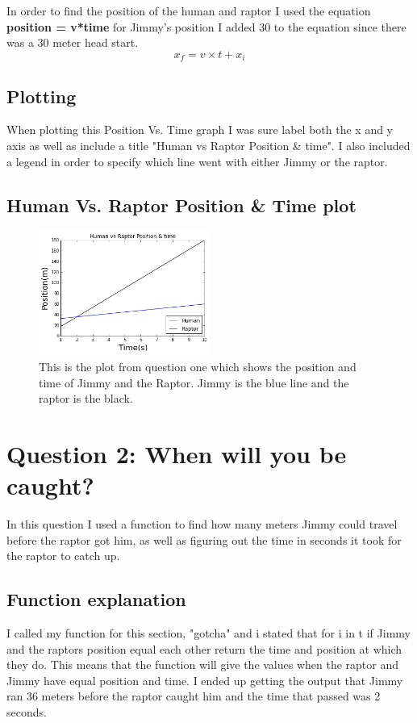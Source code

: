 \documentclass[twocolumn]{revtex4}
\begin{document}
In order to find the position of the human and raptor I used the equation \textbf{position = v*time} for Jimmy's position I added 30 to the equation since there was a 30 meter head start.$$x_f = v \times t + x_i $$ 

\subsection{Plotting}
When plotting this Position Vs. Time graph I was sure label both the x and y axis as well as include a title "Human vs Raptor Position \& time". I also included a legend in order to specify which line went with either Jimmy or the raptor.


\subsection{Human Vs. Raptor Position \& Time plot}
\begin{figure}
\includegraphics[width=0.5\textwidth]{Jimmy_Graph.png}
\caption {This is the plot from question one which shows the 	position and time of Jimmy and the Raptor. Jimmy is the blue line and the raptor is the black.}
\label{fig:Position vs. Time}
\end{figure}


\section{Question 2: When will you be caught?}

In this question I used a function to find how many meters Jimmy could travel before the raptor got him, as well as figuring out the time in seconds it took for the raptor to catch up. 

\subsection{Function explanation}

I called my function for this section, "gotcha" and i stated that for i in t if Jimmy and the raptors position equal each other return the time and position at which they do. This means that the function will give the values when the raptor and Jimmy have equal position and time. I ended up getting the output that Jimmy ran 36 meters before the raptor caught him and the time that passed was 2 seconds. 
\end{document}
